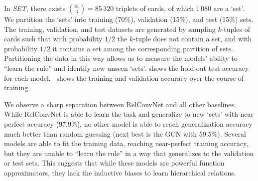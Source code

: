 
In \textit{SET}, there exists $\binom{81}{3} = 85\,320$ triplets of cards, of which $1\,080$ are a `set'. We partition the `sets' into training (70\%), validation (15\%), and test (15\%) sets. The training, validation, and test datasets are generated by sampling $k$-tuples of cards such that with probability $1/2$ the $k$-tuple does not contain a set, and with probability $1/2$ it contains a set among the corresponding partition of sets. Partitioning the data in this way allows us to measure the models' ability to ``learn the rule'' and identify new unseen `sets'.
 shows the hold-out test accuracy for each model.~ shows the training and validation accuracy over the course of training.

We observe a sharp separation between RelConvNet and all other baselines. While RelConvNet is able to learn the task and generalize to new `sets' with near perfect accuracy (97.9\%), no other model is able to reach generalization accuracy much better than random guessing (next best is the GCN with 59.5\%). Several models are able to fit the training data, reaching near-perfect training accuracy, but they are unable to ``learn the rule'' in a way that generalizes to the validation or test sets. This suggests that while these models are powerful function approximators, they lack the inductive biases to learn hierarchical relations.

